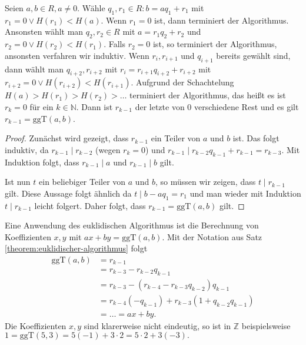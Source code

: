 \begin{theorem}\label{theorem:euklidischer-algorithmus}
    Seien $a,b\in R, a\neq 0$. Wähle $q_1,r_1\in R:b=aq_1+r_1$ mit $r_1=0\lor H(r_1)<H(a)$. Wenn $r_1=0$ ist, dann terminiert der Algorithmus. Ansonsten wählt man $q_2,r_2\in R$ mit
    $a=r_1q_2+r_2$ und $r_2=0\lor H(r_2)<H(r_1)$. Falls $r_2=0$ ist, so terminiert der Algorithmus, ansonsten verfahren wir induktiv. Wenn $r_i, r_{i+1}$ und $q_{i+1}$ bereits gewählt sind, dann wählt man $q_{i+2},r_{i+2}$ mit $r_i=r_{i+1}q_{i+2}+r_{i+2}$ mit $r_{i+2}=0\lor H(r_{i+2})<H(r_{i+1})$. Aufgrund der Schachtelung $H(a)>H(r_1)>H(r_2)>\ldots$ terminiert der Algorithmus, das heißt es ist $r_k=0$ für ein $k\in\mathbb{N}$. Dann ist $r_{k-1}$ der letzte von $0$ verschiedene Rest und es gilt $r_{k-1}=\mathrm{ggT}(a,b)$.
\end{theorem}

\begin{proof}
    Zunächst wird gezeigt, dass $r_{k-1}$ ein Teiler von $a$ und $b$ ist. Das folgt induktiv,
    da $r_{k-1}\mid r_{k-2}$ (wegen $r_k=0$) und $r_{k-1}\mid r_{k-2}q_{k-1}+r_{k-1}=r_{k-3}$.
    Mit Induktion folgt, dass $r_{k-1}\mid a$ und $r_{k-1}\mid b$ gilt.

    Ist nun $t$ ein beliebiger Teiler von $a$ und $b$, so müssen wir zeigen, dass $t\mid r_{k-1}$ gilt.
    Diese Aussage folgt ähnlich da $t\mid b-aq_1=r_1$ und man wieder mit Induktion $t\mid r_{k-1}$ leicht folgert.
    Daher folgt, dass $r_{k-1}=\mathrm{ggT}(a,b)$ gilt. 
\end{proof}

\begin{remark}
    Eine Anwendung des euklidischen Algorithmus ist die Berechnung von Koeffizienten $x,y$ mit
    $ax+by=\mathrm{ggT}(a,b)$. Mit der Notation aus Satz \ref{theorem:euklidischer-algorithmus} folgt
    \begin{align*}
        \mathrm{ggT}(a,b)&=r_{k-1}\\
        &=r_{k-3}-r_{k-2}q_{k-1}\\
        &=r_{k-3}-(r_{k-4}-r_{k-3}q_{k-2})q_{k-1}\\
        &=r_{k-4}(-q_{k-1})+r_{k-3}(1+q_{k-2}q_{k-1})\\
        &=\ldots=ax+by.
    \end{align*}
    Die Koeffizienten $x,y$ sind klarerweise nicht eindeutig, so ist in $\mathbb{Z}$ beispielsweise
    $1=\mathrm{ggT}(5,3)=5(-1)+3\cdot2=5\cdot 2+3(-3).$
\end{remark}


